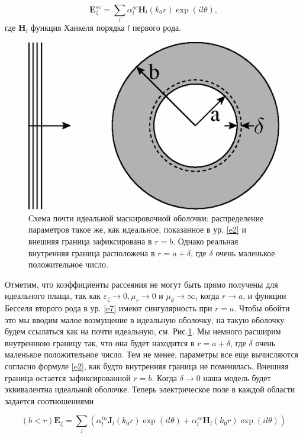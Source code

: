 \documentclass[a4paper, 12pt]{article}
\begin{document}
\begin{equation}\label{e9}
	\mathbf{E}_\zeta^{sc} = \sum\limits_l \alpha_l^{sc} \mathbf{H}_l(k_0 r)\exp(il\theta),
\end{equation}
где $\mathbf{H}_l$ функция Ханкеля порядка $l$ первого рода.

\begin{figure}[t]
  \centering
  \includegraphics[height=0.15\paperheight]{1.png}
  \caption{Схема почти идеальной маскировочной оболочки: распределение параметров такое же, как идеальное, показанное в
  ур. \eqref{e2} и внешняя граница зафиксирована в $r=b$. Однако реальная внутренняя граница расположена в 
  $r=a +\delta$, где $\delta$ очень маленькое положительное число.}
  \label{fig:1}
\end{figure}

Отметим, что коэффициенты рассеяния не могут быть прямо получены для идеального плаща, так как $\varepsilon_\zeta \to 0,
\mu_r \to 0$ и $\mu_\theta \to \infty$, когда $r \to a$, и функции Бесселя второго рода в ур. \eqref{e7} имеют 
сингулярность при $r = a$. Чтобы обойти это мы вводим малое возмущение в идеальную оболочку, на такую оболочку будем
ссылаться как на почти идеальную, см. Рис.\ref{fig:1}.  Мы немного расширим внутреннюю границу так, что она будет
находится в $r = a + \delta$, где $\delta$ очень маленькое положительное число. Тем не менее, параметры все еще
вычисляются согласно формуле \eqref{e2}, как будто внутренняя граница не поменялась. Внешняя граница остается
зафиксированной $r = b$. Когда $\delta \to 0$ наша модель будет эквивалентна идеальной оболочке. Теперь электрическое
поле в каждой области задается соотношениями

\begin{equation*}
	(b<r)\mathbf{E}_\zeta = \sum\limits_l (\alpha_l^{in} \mathbf{J}_l(k_0 r)\exp(il\theta) +
								\alpha_l^{sc} \mathbf{H}_l(k_0 r)\exp(il\theta))
\end{equation*}
 
\end{document}
